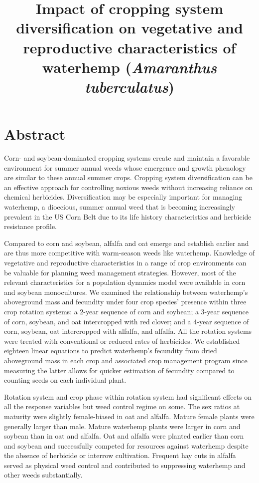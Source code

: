 \documentclass[
]{article}
\title{Impact of cropping system diversification on vegetative and reproductive characteristics of waterhemp (\emph{Amaranthus tuberculatus})}
\author{}
\date{\vspace{-2.5em}}
\begin{document}
\maketitle
\hypertarget{abstract}{%
\section*{Abstract}\label{abstract}}

Corn- and soybean-dominated cropping systems create and maintain a favorable environment for summer annual weeds whose emergence and growth phenology are similar to these annual summer crops. Cropping system diversification can be an effective approach for controlling noxious weeds without increasing reliance on chemical herbicides. Diversification may be especially important for managing waterhemp, a dioecious, summer annual weed that is becoming increasingly prevalent in the US Corn Belt due to its life history characteristics and herbicide resistance profile.

Compared to corn and soybean, alfalfa and oat emerge and establish earlier and are thus more competitive with warm-season weeds like waterhemp. Knowledge of vegetative and reproductive characteristics in a range of crop environments can be valuable for planning weed management strategies. However, most of the relevant characteristics for a population dynamics model were available in corn and soybean monocultures. We examined the relationship between waterhemp's aboveground mass and fecundity under four crop species' presence within three crop rotation systems: a 2-year sequence of corn and soybean; a 3-year sequence of corn, soybean, and oat intercropped with red clover; and a 4-year sequence of corn, soybean, oat intercropped with alfalfa, and alfalfa. All the rotation systems were treated with conventional or reduced rates of herbicides. We established eighteen linear equations to predict waterhemp's fecundity from dried aboveground mass in each crop and associated crop management program since measuring the latter allows for quicker estimation of fecundity compared to counting seeds on each individual plant.

Rotation system and crop phase within rotation system had significant effects on all the response variables but weed control regime on some. The sex ratios at maturity were slightly female-biased in oat and alfalfa. Mature female plants were generally larger than male. Mature waterhemp plants were larger in corn and soybean than in oat and alfalfa. Oat and alfalfa were planted earlier than corn and soybean and successfully competed for resources against waterhemp despite the absence of herbicide or interrow cultivation. Frequent hay cuts in alfalfa served as physical weed control and contributed to suppressing waterhemp and other weeds substantially.
\end{document}
